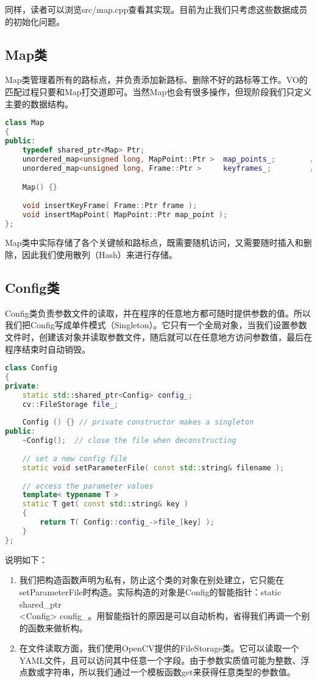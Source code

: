 同样，读者可以浏览src/map.cpp查看其实现。目前为止我们只考虑这些数据成员的初始化问题。

\subsection{Map类}
Map类管理着所有的路标点，并负责添加新路标、删除不好的路标等工作。VO的匹配过程只要和Map打交道即可。当然Map也会有很多操作，但现阶段我们只定义主要的数据结构。

\begin{lstlisting}[language=c++,caption=slambook/project/0.1/include/myslam/map.h]
class Map
{
public:
	typedef shared_ptr<Map> Ptr;
	unordered_map<unsigned long, MapPoint::Ptr >  map_points_;        // all landmarks
	unordered_map<unsigned long, Frame::Ptr >     keyframes_;         // all key-frames

	Map() {}
	
	void insertKeyFrame( Frame::Ptr frame );
	void insertMapPoint( MapPoint::Ptr map_point );
};
\end{lstlisting}

Map类中实际存储了各个关键帧和路标点，既需要随机访问，又需要随时插入和删除，因此我们使用散列（Hash）来进行存储。

\subsection{Config类}

Config类负责参数文件的读取，并在程序的任意地方都可随时提供参数的值。所以我们把Config写成单件模式（Singleton）。它只有一个全局对象，当我们设置参数文件时，创建该对象并读取参数文件，随后就可以在任意地方访问参数值，最后在程序结束时自动销毁。

\begin{lstlisting}[language=c++,caption=slambook/project/0.1/include/myslam/config.h]
class Config
{
private:
	static std::shared_ptr<Config> config_; 
	cv::FileStorage file_;
	
	Config () {} // private constructor makes a singleton
public:
	~Config();  // close the file when deconstructing 
	
	// set a new config file 
	static void setParameterFile( const std::string& filename ); 
	
	// access the parameter values
	template< typename T >
	static T get( const std::string& key )
	{
		return T( Config::config_->file_[key] );
	}
};
\end{lstlisting}

说明如下：
\begin{enumerate}
	\item 我们把构造函数声明为私有，防止这个类的对象在别处建立，它只能在setParameterFile时构造。实际构造的对象是Config的智能指针：static shared\_ptr\\<Config> config_。用智能指针的原因是可以自动析构，省得我们再调一个别的函数来做析构。
	\item 在文件读取方面，我们使用OpenCV提供的FileStorage类。它可以读取一个YAML文件，且可以访问其中任意一个字段。由于参数实质值可能为整数、浮点数或字符串，所以我们通过一个模板函数get来获得任意类型的参数值。
\end{enumerate}

